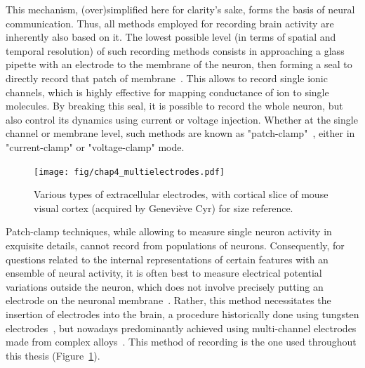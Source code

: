 This mechanism, (over)simplified here for clarity's sake, forms the basis of neural communication. Thus, all methods employed for recording brain activity are inherently also based on it. The lowest possible level (in terms of spatial and temporal resolution) of such recording methods consists in approaching a glass pipette with an electrode to the membrane of the neuron, then forming a seal to directly record that patch of membrane~\cite{sakmann1984patch}. This allows to record single ionic channels, which is highly effective for mapping conductance of ion to single molecules. By breaking this seal, it is possible to record the whole neuron, but also control its dynamics using current or voltage injection. Whether at the single channel or membrane level, such methods are known as "patch-clamp"~\cite{neher1992patch}, either in "current-clamp" or "voltage-clamp" mode. 

\begin{figure}[h!tbp]
\vspace{0.1cm}
\centering
\texttt{[image: fig/chap4\_multielectrodes.pdf]}
\caption[Extracellular electrodes.]{Various types of extracellular electrodes, with cortical slice of mouse visual cortex (acquired by Geneviève Cyr) for size reference. }
\label{fig_chap4_multielectrodes}
\end{figure} 

Patch-clamp techniques, while allowing to measure single neuron activity in exquisite details, cannot record from populations of neurons. Consequently, for questions related to the internal representations of certain features with an ensemble of neural activity, it is often best to measure electrical potential variations outside the neuron, which does not involve precisely putting an electrode on the neuronal membrane~\cite{buzsaki2012origin}. Rather, this method necessitates the insertion of electrodes into the brain, a procedure historically done using tungsten electrodes~\cite{hubel1959receptive, garrido2022understanding}, but nowadays predominantly achieved using multi-channel electrodes made from complex alloys~\cite{csicsvari2003massively}. This method of recording is the one used throughout this thesis (Figure~\ref{fig_chap4_multielectrodes}).

